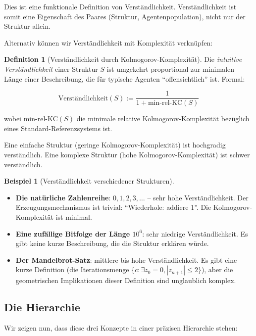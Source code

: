 \documentclass[a4paper,12pt]{article}
\theoremstyle{definition}
\newtheorem{definition}{Definition}
\newtheorem{beispiel}{Beispiel}
\begin{document}
Dies ist eine funktionale Definition von Verständlichkeit. Verständlichkeit ist somit eine Eigenschaft des Paares (Struktur, Agentenpopulation), nicht nur der Struktur allein.

Alternativ können wir Verständlichkeit mit Komplexität verknüpfen:

\begin{definition}[Verständlichkeit durch Kolmogorov-Komplexität]
Die \textit{intuitive Verständlichkeit} einer Struktur $S$ ist umgekehrt proportional zur minimalen Länge einer Beschreibung, die für typische Agenten ``offensichtlich'' ist. Formal:

$$\text{Verständlichkeit}(S) := \frac{1}{1 + \text{min-rel-KC}(S)}$$

wobei $\text{min-rel-KC}(S)$ die minimale relative Kolmogorov-Komplexität bezüglich eines Standard-Referenzsystems ist.
\end{definition}

Eine einfache Struktur (geringe Kolmogorov-Komplexität) ist hochgradig verständlich. Eine komplexe Struktur (hohe Kolmogorov-Komplexität) ist schwer verständlich.

\begin{beispiel}[Verständlichkeit verschiedener Strukturen]
\begin{itemize}
\item \textbf{Die natürliche Zahlenreihe}: $0, 1, 2, 3, \ldots$ -- sehr hohe Verständlichkeit. Der Erzeugungsmechanismus ist trivial: ``Wiederhole: addiere 1''. Die Kolmogorov-Komplexität ist minimal.

\item \textbf{Eine zufällige Bitfolge der Länge $10^6$}: sehr niedrige Verständlichkeit. Es gibt keine kurze Beschreibung, die die Struktur erklären würde.

\item \textbf{Der Mandelbrot-Satz}: mittlere bis hohe Verständlichkeit. Es gibt eine kurze Definition (die Iterationsmenge $\{c : \exists z_0 = 0, |z_{n+1}| \leq 2\}$), aber die geometrischen Implikationen dieser Definition sind unglaublich komplex.
\end{itemize}
\end{beispiel}

\subsection{Die Hierarchie}

Wir zeigen nun, dass diese drei Konzepte in einer präzisen Hierarchie stehen:
\end{document}
